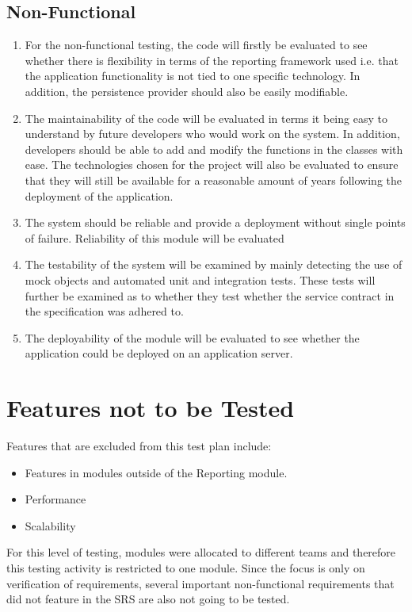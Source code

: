 \subsection{Non-Functional}
\begin{enumerate}
\item For the non-functional testing, the code will firstly be evaluated to see whether there is flexibility in terms of the reporting framework used i.e. that the application functionality is not tied to one specific technology. In addition, the persistence provider should also be easily modifiable. 
\item The maintainability of the code will be evaluated in terms it being easy to understand by future developers who would work on the system. In addition, developers should be able to add and modify the functions in the classes with ease. The technologies chosen for the project will also be evaluated to ensure that they will still be available for a reasonable amount of years following the deployment of the application.
\item The system should be reliable and provide a deployment without single points of failure. Reliability of this module will be evaluated 
\item The testability of the system will be examined by mainly detecting the use of mock objects and automated unit and integration tests. These tests will further be examined as to whether they test whether the service contract in the specification was adhered to.
\item The deployability of the module will be evaluated to see whether the application could be deployed on an application server.
\end{enumerate}
\section{Features not to be Tested}
Features that are excluded from this test plan include:
\begin{itemize}
	\item Features in modules outside of the Reporting module.
	\item Performance
	\item Scalability
\end{itemize}

For this level of testing, modules were allocated to different teams and therefore this testing activity is restricted to one module. Since the focus is only on verification of requirements, several important non-functional requirements that did not feature in the SRS are also not going to be tested.

